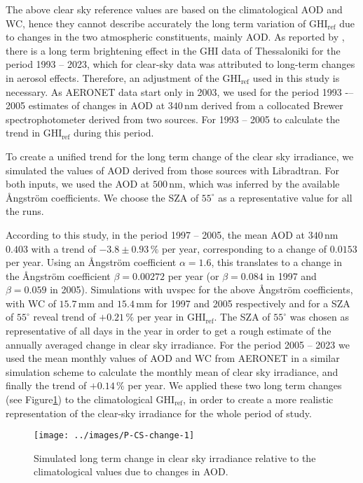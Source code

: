 \documentclass[preprint, 5p,
authoryear]{elsarticle} %
\begin{document}
The above clear sky reference values are based on the climatological AOD
and WC, hence they cannot describe accurately the long term variation of
\(\text{GHI}_\text{ref}\) due to changes in the two atmospheric
constituents, mainly AOD. As reported by \citet{Natsis2023}, there is a
long term brightening effect in the GHI data of Thessaloniki for the
period 1993 -- 2023, which for clear-sky data was attributed to
long-term changes in aerosol effects. Therefore, an adjustment of the
\(\text{GHI}_\text{ref}\) used in this study is necessary. As AERONET
data start only in 2003, we used for the period 1993 -\/-- 2005
estimates of changes in AOD at \(340\,\text{nm}\) derived from a
collocated Brewer spectrophotometer derived from two sources. For 1993
-- 2005 \citep{Kazadzis2007} to calculate the trend in
\(\text{GHI}_\text{ref}\) during this period.

To create a unified trend for the long term change of the clear sky
irradiance, we simulated the values of AOD derived from those sources
with Libradtran. For both inputs, we used the AOD at \(500\,\text{nm}\),
which was inferred by the available Ångström coefficients. We choose the
SZA of \(55^\circ\) as a representative value for all the runs.

According to this study, in the period 1997 -- 2005, the mean AOD at
\(340\,\text{nm}\) \(0.403\) with a trend of \(-3.8\pm0.93\,\%\) per
year, corresponding to a change of \(0.0153\) per year. Using an
Ångström coefficient \(\alpha = 1.6\), this translates to a change in
the Ångström coefficient \(\beta=0.00272\) per year (or \(\beta=0.084\)
in 1997 and \(\beta=0.059\) in 2005). Simulations with uvspec for the
above Ångström coefficients, with WC of \(15.7\,\text{mm}\) and
\(15.4\,\text{mm}\) for 1997 and 2005 respectively and for a SZA of
\(55^\circ\) reveal trend of \(+0.21\,\%\) per year in
\(\text{GHI}_\text{ref}\). The SZA of \(55^\circ\) was chosen as
representative of all days in the year in order to get a rough estimate
of the annually averaged change in clear sky irradiance. For the period
2005 -- 2023 we used the mean monthly values of AOD and WC from AERONET
in a similar simulation scheme to calculate the monthly mean of clear
sky irradiance, and finally the trend of \(+0.14\,\%\) per year. We
applied these two long term changes (see
Figure\nobreakspace{}\ref{fig:CS-change}) to the climatological
\(\text{GHI}_\text{ref}\), in order to create a more realistic
representation of the clear-sky irradiance for the whole period of
study.

\begin{figure}

{\centering \texttt{[image: ../images/P-CS-change-1]} 

}

\caption{Simulated long term change in clear sky irradiance relative to the climatological values due to changes in AOD.}\label{fig:CS-change}
\end{figure}
\end{document}
